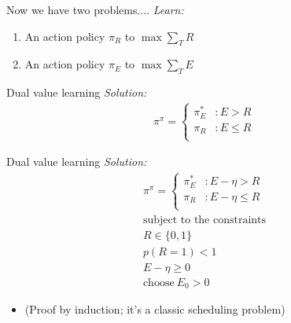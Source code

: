 \documentclass[10pt]{beamer}
\begin{document}
\begin{frame}[fragile]{Now we have two problems....}
\textit{Learn:}
\begin{enumerate}
    \item An action policy $\pi_R$ to $\max \sum_T R$
    \item An action policy $\pi_E$ to \alert{$\max \sum_T E$}
\end{enumerate}
\end{frame}

\begin{frame}[fragile]{Dual value learning}
\textit{Solution:}
\begin{equation*}
    \label{eq:pipi} 
	\begin{split}
		\pi^{\pi} = 
		\begin{cases}
			\pi^*_E & : E > R \\
			\pi_R & : E \le R \\
		\end{cases}
	\end{split}
\end{equation*}
\end{frame}

\begin{frame}[fragile]{Dual value learning}
\textit{Solution:}
\begin{equation*}
    \label{eq:pipi} 
	\begin{split}
		\pi^{\pi} = 
		\begin{cases}
			\pi^*_E & : E - \eta > R \\
			\pi_R & : E - \eta \le R \\
		\end{cases}
		\\
		\text{subject to the constraints}\\
		R \in \{0, 1\} \\
		p(R=1) < 1 \\
		E - \eta \geq 0 \\
		\text{choose}\ E_0 > 0
	\end{split}
\end{equation*}
\begin{itemize}
\item (Proof by induction; it's a classic scheduling problem)
\end{itemize}
\end{frame}
\end{document}
